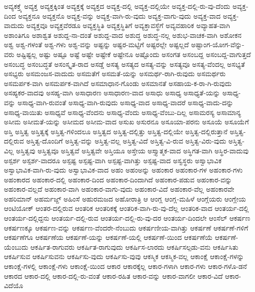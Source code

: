 {ಅವ್ಯಕಕ್ತ್ಕೆ
ಅವ್ಯಕ್ತ
ಅವ್ಯಕ್ತಕ್ಕಿಂತ
ಅವ್ಯಕ್ತಕ್ಕೆ
ಅವ್ಯಕ್ತದ
ಅವ್ಯಕ್ತ-ದಲ್ಲಿ
ಅವ್ಯಕ್ತ-ದಲ್ಲಿಯೇ
ಅವ್ಯಕ್ತ-ದಲ್ಲಿ-ರು-ವು-ದೆಂದು
ಅವ್ಯಕ್ತ-ದಿಂದ
ಅವ್ಯಕ್ತನೂ
ಅವ್ಯಕ್ತನೊ
ಅವ್ಯಕ್ತ-ವನ್ನು
ಅವ್ಯಕ್ತ-ವಾಗಿ-ರು-ವುದು
ಅವ್ಯಕ್ತ-ವಾಗು-ವುದು
ಅವ್ಯಕ್ತ-ವಾದ
ಅವ್ಯಕ್ತ-ವಾದುದು
ಅವ್ಯಕ್ತವೂ
ಅವ್ಯಕ್ತವೆರಡೂ
ಅವ್ಯಕ್ತಸ್ಥಿತಿ
ಅವ್ಯಕ್ತಸ್ಥಿತಿಗೆ
ಅವ್ಯಕ್ತಾವಸ್ಥೆಗೆ
ಅವ್ಯವಹಾರಿಕ
ಅವ್ಯಾಹತ-ವಾಗಿ
ಅಶಾಂತಿಗೂ
ಅಶಾಶ್ವತ
ಅಶುದ್ದ-ನಾ-ದಂತೆ
ಅಶುದ್ದ-ವಾದ
ಅಶುದ್ಧ
ಅಶುದ್ಧ-ನಲ್ಲ
ಅಶುಭ-ವಾಚಕ-ವಾಗಿ
ಅಶೋಕನ
ಅಶ್ವ
ಅಶ್ವ-ಗಳಂತೆ
ಅಶ್ವ-ಗಳು
ಅಶ್ವ-ವನ್ನು
ಅಷ್ಟನ್ನು
ಅಷ್ಟರ-ಮಟ್ಟಿಗೆ
ಅಷ್ಟರಲ್ಲೇ
ಅಷ್ಟಲ್ಲದೆ
ಅಷ್ಟಾಂಗ-ಯೋಗ-ವೆನ್ನು-ವರು
ಅಷ್ಟಿಷ್ಟಲ್ಲ
ಅಷ್ಟು
ಅಷ್ಟೂ
ಅಷ್ಟೆ
ಅಷ್ಟೇ
ಅಷ್ಟೇಕೆ
ಅಷ್ಟೇನೂ
ಅಷ್ಟೊಂದು
ಅಸಂಗತ
ಅಸಂಬದ್ದ
ಅಸಂಬದ್ದ-ವಾಗುತ್ತದೆ
ಅಸಂಬದ್ಧ
ಅಸಂಬದ್ಧತೆ
ಅಸಂಸ್ಕೃತ-ರಾದ
ಅಸಡ್ಡೆ
ಅಸತ್ಯ
ಅಸತ್ಯದ
ಅಸತ್ಯ-ವನ್ನು
ಅಸತ್ಯವೂ
ಅಸತ್ಯ-ವೆಂದಲ್ಲ
ಅಸಭ್ಯತೆ
ಅಸಭ್ಯರು
ಅಸಮಂಜಸ-ವಾದುದು
ಅಸಮತೆಗೆ
ಅಸಮತೆ-ಯನ್ನು
ಅಸಮರ್ಥ-ರಾಗಿ-ರುವುದು
ಅಸಮರ್ಥರು
ಅಸಮರ್ಪಕ-ವಾಗಿ
ಅಸಮರ್ಪಕ-ವಾಗಿದೆ
ಅಸಮಾಧಾನ-ಗೊಂಡು
ಅಸಮಾನತೆ
ಅಸಹಾಯ-ಕ-ರಾ-ಗಿ-ರುವುದು
ಅಸಹ್ಯಕರ-ವಾದವು
ಅಸಹ್ಯ-ವಾಗಿ
ಅಸಾಧಾರಣ
ಅಸಾಧಾರಣ-ವಾದ
ಅಸಾಧು
ಅಸಾಧ್ಯ
ಅಸಾಧ್ಯತೆ-ಯನ್ನು
ಅಸಾಧ್ಯ-ವನ್ನು
ಅಸಾಧ್ಯ-ವಾಗಿ-ರುವಂತೆ
ಅಸಾಧ್ಯ-ವಾಗಿ-ರುವುದು
ಅಸಾಧ್ಯ-ವಾದ
ಅಸಾಧ್ಯ-ವಾದರೆ
ಅಸಾಧ್ಯ-ವಾದು-ದನ್ನು
ಅಸಾಧ್ಯ-ವಾಯಿತು
ಅಸಾಧ್ಯವೆ
ಅಸಾಧ್ಯ-ವೆಂದನು
ಅಸಾಧ್ಯ-ವೆಂದು
ಅಸಾಧ್ಯ-ವೆಂಬು-ದಿಲ್ಲ
ಅಸಾಮರಸ್ಯ
ಅಸಾಮಾನ್ಯ
ಅಸೀಮ
ಅಸೀಮತೆ-ಯನ್ನು
ಅಸೀಮದ
ಅಸೀಮ-ವಾದ
ಅಸುಖ
ಅಸುರನೂ
ಅಸೂಯಾ-ಪರನು
ಅಸೂಯೆ
ಅಸೂಯೆಗೆ
ಅಸ್ತಿ
ಅಸ್ತಿತ್ವ
ಅಸ್ತಿತ್ವಕ್ಕೆ
ಅಸ್ತಿತ್ವ-ಗಳಿಂದಲೂ
ಅಸ್ತಿತ್ವದ
ಅಸ್ತಿತ್ವ-ದಲ್ಲಿತ್ತು
ಅಸ್ತಿತ್ವ-ದಲ್ಲಿಯೇ
ಅಸ್ತಿತ್ವ-ದಲ್ಲಿರುತ್ತಾನೆ
ಅಸ್ತಿತ್ವ-ದಲ್ಲಿರುವ
ಅಸ್ತಿತ್ವ-ದೊಂದಿಗೆ
ಅಸ್ತಿತ್ವ-ವನ್ನು
ಅಸ್ತಿತ್ವ-ವಲ್ಲ
ಅಸ್ತಿತ್ವ-ವಿದೆ
ಅಸ್ತಿತ್ವ-ವಿ-ರುವ
ಅಸ್ತಿತ್ವ-ವಿರು-ವುದು
ಅಸ್ತಿತ್ವ-ವಿಲ್ಲ
ಅಸ್ತಿತ್ವವು
ಅಸ್ತಿತ್ವವೂ
ಅಸ್ತಿತ್ವವೆ
ಅಸ್ತಿತ್ವವೇ
ಅಸ್ತಿಯೂ
ಅಸ್ತೇಯ
ಅಸ್ತ್ಯಾತ್ಮಕ-ವಾದ
ಅಸ್ಥಿಗತ-ವಾಗಿ
ಅಸ್ಥಿರ-ವಾದುವು
ಅಸ್ಪರ್ಶ
ಅಸ್ಪರ್ಶ-ವಾದರೂ
ಅಸ್ಪಷ್ಟ
ಅಸ್ಪಷ್ಟ-ವಾಗಿ
ಅಸ್ಪಷ್ಟ-ವಾಗಿತ್ತು
ಅಸ್ಪಷ್ಟ-ವಾದ
ಅಸ್ವಸ್ಥರು
ಅಸ್ವಾಭಾವಿಕ
ಅಸ್ವಾಭಾವಿಕ-ವಾಗಿ-ರು-ವುದು
ಅಸ್ವಾಭಾವಿಕ-ವಾದ
ಅಹಂ
ಅಹಂಅನ್ನು
ಅಹಂಕಾರ
ಅಹಂಕಾರ-ಗಳ
ಅಹಂಕಾರ-ಗಳು
ಅಹಂಕಾರದ
ಅಹಂಕಾರ-ದಲ್ಲಿ
ಅಹಂಕಾರ-ದಿಂದ
ಅಹಂಕಾರ-ದಿಂದಾಗಿದೆ
ಅಹಂಕಾರ-ಪಡುವ
ಅಹಂಕಾರ-ವನ್ನು
ಅಹಂಕಾರ-ವಲ್ಲದೆ
ಅಹಂಕಾರ-ವಾಗಿ
ಅಹಂಕಾರ-ವಾಗು-ವುದು
ಅಹಂಕಾರ-ವಿದೆ
ಅಹಂಕಾರ-ವೆಲ್ಲ
ಅಹಂಕಾರವೇ
ಅಹರಿಮಾನ್
ಅಹರ್ಮಜ್ದ್
ಅಹಿಂಸೆ
ಅಹುರಮಜದ
ಅಹೋರಾತ್ರಿ
ಆ
ಆಂಗ್ಲ
ಆಂಗ್ಲ-ಮಹಿಳೆ
ಆಂಗ್ಲೆಯರು
ಆಂಗ್ಲೇಯ
ಆಂಟಿಯೋಕ್
ಆಂತರ-ದಲ್ಲಿರುವ
ಆಂತರಿಕ
ಆಂತರಿಕಕ್ಕೆ
ಆಂತರಿಕ-ವಾಗಿ-ರು-ವು-ದೆಲ್ಲ
ಆಂತರಿಕ-ವಾದ
ಆಂತರ್ಯ-ದಲ್ಲಿ
ಆಂತರ್ಯ-ದಲ್ಲಿದ್ದನು
ಆಂತರ್ಯ-ದಲ್ಲಿ-ರುವ
ಆಂತರ್ಯ-ದಲ್ಲಿ-ರು-ವು-ದರ
ಆಂತರ್ಯ-ದಿಂದಲೇ
ಆಂಸೆಲ್
ಆಕರ್ಷಣ
ಆಕರ್ಷಣಕ್ಕೂ
ಆಕರ್ಷಣ-ವನ್ನು
ಆಕರ್ಷಣ-ವೆಂದರೇ-ನೆಂಬುದು
ಆಕರ್ಷಣೀಯ-ವಾಗಿತ್ತು
ಆಕರ್ಷಣೆ
ಆಕರ್ಷಣೆ-ಗಳಿಗೆ
ಆಕರ್ಷಣೆಗೂ
ಆಕರ್ಷಣೆಯ
ಆಕರ್ಷಣೆ-ಯನ್ನು
ಆಕರ್ಷಣೆ-ಯಲ್ಲಿ
ಆಕರ್ಷಣೆ-ಯಿಂದ
ಆಕರ್ಷಣೆಯೆ
ಆಕರ್ಷಣೆ-ಯೆಂಬುದು
ಆಕರ್ಷಿತ-ರಾಗುವರು
ಆಕರ್ಷಿತ-ರಾಗುವುದು
ಆಕರ್ಷಿಸ-ಲಾರದು
ಆಕರ್ಷಿಸಲ್ಪಡು-ವನು
ಆಕರ್ಷಿಸಿತು
ಆಕರ್ಷಿಸುವ
ಆಕರ್ಷಿಸುವನು
ಆಕರ್ಷಿಸು-ವುದು
ಆಕರ್ಷಿಸು-ವುವು
ಆಕಸ್ಮಿಕ
ಆಕಸ್ಮಿಕ-ವಲ್ಲ
ಆಕಾಂಕ್ಷೆ
ಆಕಾಂಕ್ಷೆ-ಗಳನ್ನು
ಆಕಾಂಕ್ಷೆ-ಗಳಲ್ಲಿ
ಆಕಾಂಕ್ಷೆ-ಗಳು
ಆಕಾಂಕ್ಷೆ-ಯಿಂದ
ಆಕಾರ
ಆಕಾರಕ್ಕೆಲ್ಲ
ಆಕಾರ-ಗಳಾಗಿ
ಆಕಾರ-ಗಳು
ಆಕಾರ-ಗಳೊ-ಡನೆ
ಆಕಾರದ
ಆಕಾರ-ದಲ್ಲಿ
ಆಕಾರ-ದಲ್ಲಿ-ರು-ವಂತೆ
ಆಕಾರ-ರಹಿತ
ಆಕಾರ-ವನ್ನು
ಆಕಾರ-ವಾಗಲೀ
ಆಕಾರ-ವಿದೆ
ಆಕಾರ-ವಿದೆಯೊ
}
